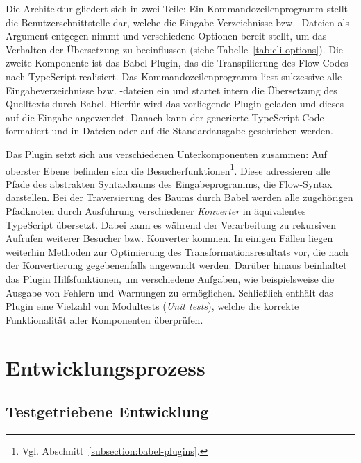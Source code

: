Die Architektur gliedert sich in zwei Teile: Ein Kommandozeilenprogramm stellt die Benutzerschnittstelle dar, welche die Eingabe-Verzeichnisse bzw. -Dateien als Argument entgegen nimmt und verschiedene Optionen bereit stellt, um das Verhalten der Übersetzung zu beeinflussen (siehe Tabelle~\ref{tab:cli-options}). Die zweite Komponente ist das Babel-Plugin, das die Transpilierung des Flow-Codes nach TypeScript realisiert. Das Kommandozeilenprogramm liest sukzessive alle Eingabeverzeichnisse bzw. -dateien ein und startet intern die Übersetzung des Quelltexts durch Babel. Hierfür wird das vorliegende Plugin geladen und dieses auf die Eingabe angewendet. Danach kann der generierte TypeScript-Code formatiert und in Dateien oder auf die Standardausgabe geschrieben werden.

Das Plugin setzt sich aus verschiedenen Unterkomponenten zusammen: Auf oberster Ebene befinden sich die Besucherfunktionen\footnote{Vgl. Abschnitt~\ref{subsection:babel-plugins}.}. Diese adressieren alle Pfade des abstrakten Syntaxbaums des Eingabeprogramms, die Flow-Syntax darstellen. Bei der Traversierung des Baums durch Babel werden alle zugehörigen Pfadknoten durch Ausführung verschiedener \emph{Konverter} in äquivalentes TypeScript übersetzt. Dabei kann es während der Verarbeitung zu rekursiven Aufrufen weiterer Besucher bzw. Konverter kommen. In einigen Fällen liegen weiterhin Methoden zur Optimierung des Transformationsresultats vor, die nach der Konvertierung gegebenenfalls angewandt werden. Darüber hinaus beinhaltet das Plugin Hilfsfunktionen, um verschiedene Aufgaben, wie beispielsweise die Ausgabe von Fehlern und Warnungen zu ermöglichen. Schließlich enthält das Plugin eine Vielzahl von Modultests (\textit{Unit tests}), welche die korrekte Funktionalität aller Komponenten überprüfen.

\section{Entwicklungsprozess}


\subsection{Testgetriebene Entwicklung}

